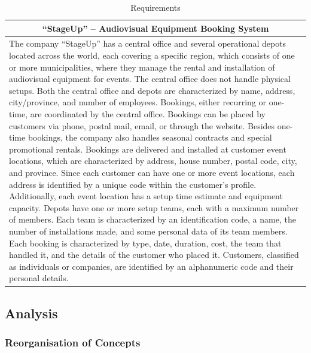 \documentclass[12pt]{article}
\begin{document}
\begin{table}[H]
  \renewcommand{\arraystretch}{1.3}
  \begin{tabularx}{\textwidth}{|X|}
  \hline
  \multicolumn{1}{|c|}{\textbf{``StageUp'' -- Audiovisual Equipment Booking System}} \\ \hline
  The company ``StageUp'' has a central office and several operational depots located across the world,
  each covering a specific region, which consists of one or more municipalities, where they manage the
  rental and installation of audiovisual equipment for events. The central office does not handle
  physical setups. Both the central office and depots are characterized by name, address,
  city/province, and number of employees. Bookings, either recurring or one-time, are coordinated by
  the central office. Bookings can be placed by customers via phone, postal mail, email, or through the
  website. Besides one-time bookings, the company also handles seasonal contracts and special
  promotional rentals. Bookings are delivered and installed at customer event locations, which are
  characterized by address, house number, postal code, city, and province. Since each customer can have
  one or more event locations, each address is identified by a unique code within the customer's
  profile. Additionally, each event location has a setup time estimate and equipment capacity. Depots
  have one or more setup teams, each with a maximum number of members. Each team is characterized by
  an identification code, a name, the number of installations made, and some personal data of its team
  members. Each booking is characterized by type, date, duration, cost, the team that handled it, and
  the details of the customer who placed it. Customers, classified as individuals or companies, are
  identified by an alphanumeric code and their personal details. \\ \hline
  \end{tabularx}
  \caption{Requirements}
\end{table}

\subsection{Analysis}

\subsubsection{Reorganisation of Concepts} 
\end{document}
